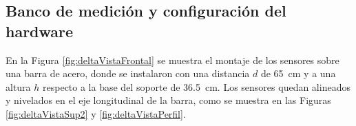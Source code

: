 \subsection{Banco de medición y configuración del hardware}\label{sec:bancoMedicionDeltaOhm}
En la Figura \ref{fig:deltaVistaFrontal} se muestra el montaje de los sensores sobre una barra de acero, donde se instalaron con una distancia $d$ de \SI{65}{\centi\meter} y a una altura $h$ respecto a la base del soporte de \SI{36.5}{\centi\meter}. Los sensores quedan alineados y nivelados en el eje longitudinal de la barra, como se muestra en las Figuras \ref{fig:deltaVistaSup2} y \ref{fig:deltaVistaPerfil}.

\begin{figure}[H]
    \centering
    \begin{minipage}[b]{0.5\textwidth}
    \end{minipage}  
    \hspace{1em} %
    \begin{minipage}[b]{0.22\textwidth}

\end{minipage}
\end{figure}
